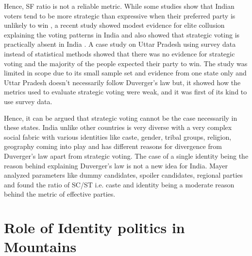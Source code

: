 Hence, SF ratio is not a reliable metric. While some studies show that Indian voters tend to be more strategic than expressive when their preferred party is unlikely to win \citep{choi2009strategic}, a recent study showed modest evidence for elite collusion explaining the voting patterns in India and also showed that strategic voting is practically absent in India \citep{ziegfeld2021accounts}. A case study on Uttar Pradesh \citep{heath2022so} using survey data instead of statistical methods showed that there was no evidence for strategic voting and the majority of the people expected their party to win. The study was limited in scope due to its small sample set and evidence from one state only and Uttar Pradesh doesn't necessarily follow Duverger's law but, it showed how the metrics used to evaluate strategic voting were weak, and it was first of its kind to use survey data. 

\vspace{0.3cm}

Hence, it can be argued that strategic voting cannot be the case necessarily in these states. India unlike other countries is very diverse with a very complex social fabric with various identities like caste, gender, tribal groups, religion, geography  coming into play and has different reasons for divergence from Duverger's law apart from strategic voting. The case of a single identity being the reason behind explaining Duverger’s law is not a new idea \citep{mayer2013gross} for India. Mayer analyzed parameters like dummy candidates, spoiler candidates, regional parties  and found the ratio of SC/ST i.e. caste and identity being a moderate reason behind the metric of effective parties. 




\section{Role of Identity politics in Mountains}

